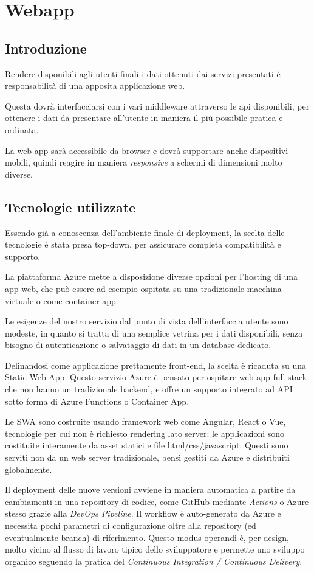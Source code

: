 \section{Webapp}
\subsection{Introduzione}
Rendere disponibili agli utenti finali i dati ottenuti dai servizi presentati è responsabilità di una apposita applicazione web. 

Questa dovrà interfacciarsi con i vari middleware attraverso le api disponibili, per ottenere i dati da presentare all'utente in maniera il più possibile pratica e ordinata.

La web app sarà accessibile da browser e dovrà supportare anche dispositivi mobili, quindi reagire in maniera \textit{responsive} a schermi di dimensioni molto diverse. 


\subsection{Tecnologie utilizzate}
Essendo già a conoscenza dell'ambiente finale di deployment, la scelta delle tecnologie è stata presa top-down, per assicurare completa compatibilità e supporto.

La piattaforma Azure mette a disposizione diverse opzioni per l'hosting di una app web, che può essere ad esempio ospitata su una tradizionale macchina virtuale o come container app.

Le esigenze del nostro servizio dal punto di vista dell'interfaccia utente sono modeste, in quanto si tratta di una semplice vetrina per i dati disponibili, senza bisogno di autenticazione o salvataggio di dati in un database dedicato.

Delinandosi come applicazione prettamente front-end, la scelta è ricaduta su una Static Web App. Questo servizio Azure è pensato per ospitare web app full-stack che non hanno un tradizionale backend, e offre un supporto integrato ad API sotto forma di Azure Functions o Container App.

Le SWA sono costruite usando framework web come Angular, React o Vue, tecnologie per cui non è richiesto rendering lato server: le applicazioni sono costituite interamente da asset statici e file html/css/javascript. Questi sono serviti non da un web server tradizionale, bensì gestiti da Azure e distribuiti globalmente.

Il deployment delle nuove versioni avviene in maniera automatica a partire da cambiamenti in una repository di codice, come GitHub mediante \textit{Actions} o Azure stesso grazie alla \textit{DevOps Pipeline}. 
Il workflow è auto-generato da Azure e necessita pochi parametri di configurazione oltre alla repository (ed eventualmente branch) di riferimento. Questo modus operandi è, per design, molto vicino al flusso di lavoro tipico dello sviluppatore e permette uno sviluppo organico seguendo la pratica del \textit{Continuous Integration / Continuous Delivery}.

